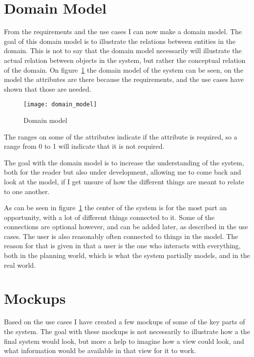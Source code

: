 \section{Domain Model}
\label{sec:Domain Model}

From the requirements and the use cases I can now make a domain model. The goal
of this domain model is to illustrate the relations between entities in the
domain\cite{larman}. This is not to say that the domain model necessarily will
illustrate the actual relation between objects in the system, but rather the
conceptual relation of the domain. On figure~\ref{fig:domain_model} the domain
model of  the system can be seen, on the model the attributes are there because
the requirements, and the use cases have shown that those are needed. 

\begin{figure}[!htb]
  \centering
  \texttt{[image: domain\_model]}
  \caption{Domain model}
  \label{fig:domain_model}
\end{figure}

The ranges on some of the attributes indicate if the attribute is required, so a
range from 0 to 1 will indicate that it is not required. 

The goal with the domain model is to increase the understanding of the system,
both for the reader but also under development, allowing me to come back and
look at the model, if I get unsure of how the different things are meant to
relate to one another. 

As can be seen in figure~\ref{fig:domain_model} the center of the system is for
the most part an opportunity, with a lot of different things connected to it.
Some of the connections are optional however, and can be added later, as
described in the use cases. The user is also reasonably often connected to
things in the model. The reason for that is given in that a user is the one who
interacts with everything, both in the planning world, which is what the system
partially models, and in the real world. 

\section{Mockups}
\label{sec:Mockups}
Based on the use cases I have created a few mockups of some of the key parts of
the system. The goal with these mockups is not necessarily to illustrate how a
the final system would look, but more a help to imagine how a view could look,
and what information would be available in that view for it to work.


